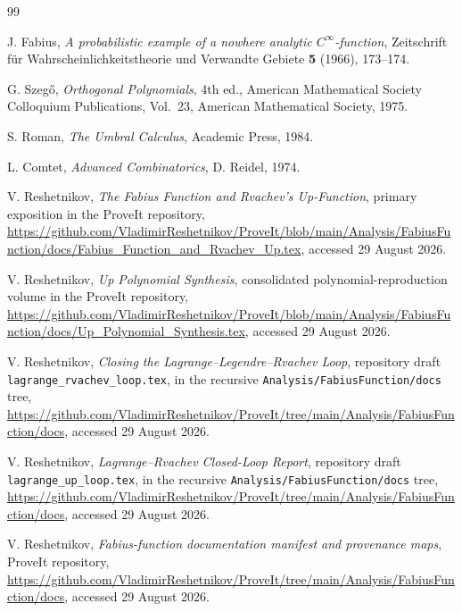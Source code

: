 \documentclass[11pt,oneside]{article}
\numberwithin{equation}{section}
\theoremstyle{definition}
\theoremstyle{remark}
\begin{document}
\begin{thebibliography}{99}

J. Fabius,
\emph{A probabilistic example of a nowhere analytic $C^\infty$-function},
Zeitschrift f\"ur Wahrscheinlichkeitstheorie und Verwandte Gebiete
\textbf{5} (1966), 173--174.

G. Szeg\H{o},
\emph{Orthogonal Polynomials},
4th ed., American Mathematical Society Colloquium Publications, Vol.~23,
American Mathematical Society, 1975.

S. Roman,
\emph{The Umbral Calculus},
Academic Press, 1984.

L. Comtet,
\emph{Advanced Combinatorics},
D. Reidel, 1974.

V. Reshetnikov,
\emph{The Fabius Function and Rvachev's Up-Function},
primary exposition in the ProveIt repository,
\url{https://github.com/VladimirReshetnikov/ProveIt/blob/main/Analysis/FabiusFunction/docs/Fabius_Function_and_Rvachev_Up.tex},
accessed 29 August 2026.

V. Reshetnikov,
\emph{Up Polynomial Synthesis},
consolidated polynomial-reproduction volume in the ProveIt repository,
\url{https://github.com/VladimirReshetnikov/ProveIt/blob/main/Analysis/FabiusFunction/docs/Up_Polynomial_Synthesis.tex},
accessed 29 August 2026.

V. Reshetnikov,
\emph{Closing the Lagrange--Legendre--Rvachev Loop},
repository draft \texttt{lagrange\_rvachev\_loop.tex}, in the recursive
\texttt{Analysis/FabiusFunction/docs} tree,
\url{https://github.com/VladimirReshetnikov/ProveIt/tree/main/Analysis/FabiusFunction/docs},
accessed 29 August 2026.

V. Reshetnikov,
\emph{Lagrange--Rvachev Closed-Loop Report},
repository draft \texttt{lagrange\_up\_loop.tex}, in the recursive
\texttt{Analysis/FabiusFunction/docs} tree,
\url{https://github.com/VladimirReshetnikov/ProveIt/tree/main/Analysis/FabiusFunction/docs},
accessed 29 August 2026.

V. Reshetnikov,
\emph{Fabius-function documentation manifest and provenance maps},
ProveIt repository,
\url{https://github.com/VladimirReshetnikov/ProveIt/tree/main/Analysis/FabiusFunction/docs},
accessed 29 August 2026.

\end{thebibliography}
\end{document}
